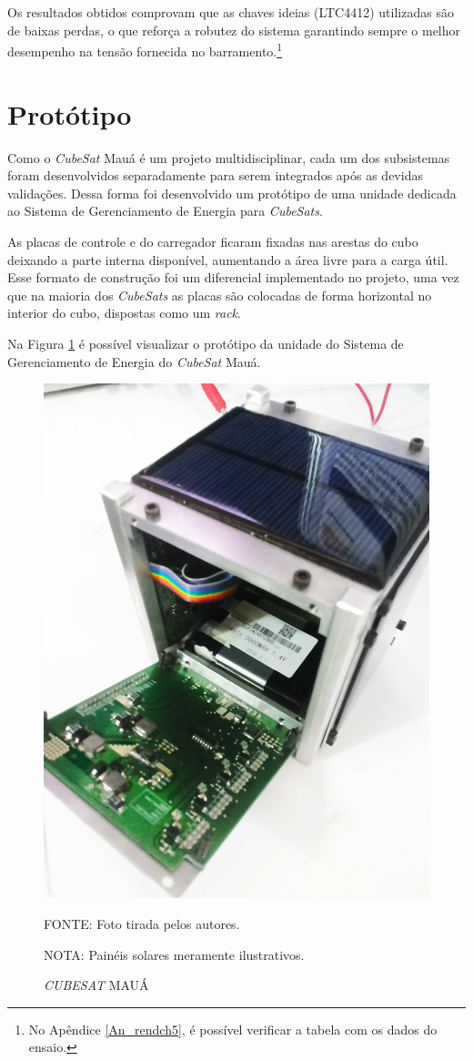 \documentclass[
	12pt,				%
	openright,			%
	oneside,			%
	a4paper,			%
	english,			%
	french,				%
	spanish,			%
	brazil,				%
	oldfontcommands
	]{abntex2}
\begin{document}
	Os resultados obtidos comprovam que as chaves ideias (LTC4412) utilizadas são de baixas perdas, o que reforça a robutez do sistema garantindo sempre o melhor desempenho na tensão fornecida no barramento.\footnote{No Apêndice \ref{An_rendch5}, é possível verificar a tabela com os dados do ensaio.} 
	
\section[Protótipo]{Protótipo}

	Como o \textit{CubeSat} Mauá é um projeto multidisciplinar, cada um dos subsistemas foram desenvolvidos separadamente para serem integrados após as devidas validações. Dessa forma foi desenvolvido um protótipo de uma unidade dedicada ao Sistema de Gerenciamento de Energia para \textit{CubeSats}.	
	
	As placas de controle e do carregador ficaram fixadas nas arestas do cubo deixando a parte interna disponível, aumentando a área livre para a carga útil. Esse formato de construção foi um diferencial implementado no projeto, uma vez que na maioria dos \textit{CubeSats} as placas são colocadas de forma horizontal no interior do cubo, dispostas como um \textit{rack}.
	
	Na Figura \ref{Fig_cube} é possível visualizar o protótipo da unidade do Sistema de Gerenciamento de Energia do \textit{CubeSat} Mauá.
	
	\begin{figure}[th]
		\caption{\textit{CUBESAT} MAUÁ}
		\label{Fig_cube}
		\centering
		\includegraphics[width=0.5\linewidth]{./figs/cube}
			
		\begin{small}
			FONTE: Foto tirada pelos autores.
		\end{small}
		
		\begin{footnotesize}
			NOTA: Painéis solares meramente ilustrativos.
		\end{footnotesize}
	\end{figure}
	
\end{document}
